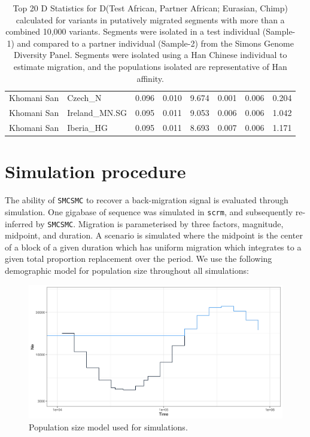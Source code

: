 \documentclass{article}
\begin{document}
\begin{table}[ht]
\begin{tabular}{rlrrrrrr}
  Khomani San & Czech\_N & 0.096 & 0.010 & 9.674 & 0.001 & 0.006 & 0.204 \\ 
  Khomani San & Ireland\_MN.SG & 0.095 & 0.011 & 9.053 & 0.006 & 0.006 & 1.042 \\ 
  Khomani San & Iberia\_HG & 0.095 & 0.011 & 8.693 & 0.007 & 0.006 & 1.171 \\ 
   \hline
\end{tabular}
\caption{Top 20 D Statistics for D(Test African, Partner African; Eurasian, Chimp) calculated for variants in putatively migrated segments with more than a combined 10,000 variants. Segments were isolated in a test individual (Sample-1) and compared to a partner individual (Sample-2) from the Simons Genome Diversity Panel. Segments were isolated using a Han Chinese individual to estimate migration, and the populations isolated are representative of Han affinity.} 
\label{dstats:top20m}
\end{table}

\newpage

\section{Simulation procedure} \label{simproc}

The ability of {\tt SMCSMC} to recover a back-migration signal is evaluated through simulation. One gigabase of sequence was simulated in {\tt scrm}, and subsequently re-inferred by {\tt SMCSMC}. Migration is parameterised by three factors, magnitude, midpoint, and duration. A scenario is simulated where the midpoint is the center of a block of a given duration which has uniform migration which integrates to a given total proportion replacement over the period. We use the following demographic model for population size throughout all simulations:

\begin{figure}[hb]
    \centering
    \includegraphics[width = 0.5\linewidth]{plot/demographic_model.png}
    \caption{Population size model used for simulations.}
    \label{fig:dem}
\end{figure}
\end{document}
